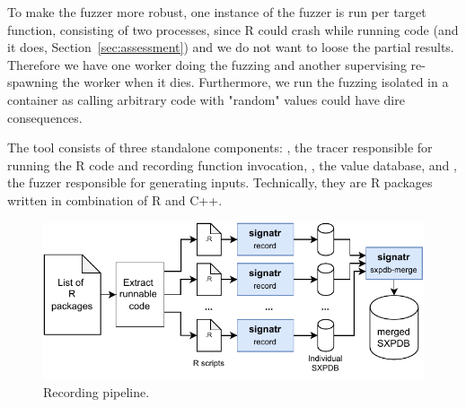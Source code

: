\documentclass[sigplan,anonymous,review]{acmart}
\begin{document}
To make the fuzzer more robust, one instance of the fuzzer is run per target function, consisting of two processes, since R could crash while running code (and it does, \Cf Section~\ref{sec:assessment}) and we do not want to loose the partial results.
Therefore we have one worker doing the fuzzing and another supervising re-spawning the worker when it dies.
Furthermore, we run the fuzzing isolated in a container as calling arbitrary code with "random" values could have dire consequences.

The tool consists of three standalone components: , the tracer responsible for running the R code and recording function invocation, , the value database, and , the fuzzer responsible for generating inputs.
Technically, they are R packages written in combination of R and C++.

\begin{figure}
    \centering
    \includegraphics[width=\columnwidth]{code-and-figures/sxdb-pipeline.pdf}
    \caption{
    Recording pipeline.
    }\label{fig:sxpdb-pipeline}
\end{figure}
\end{document}
